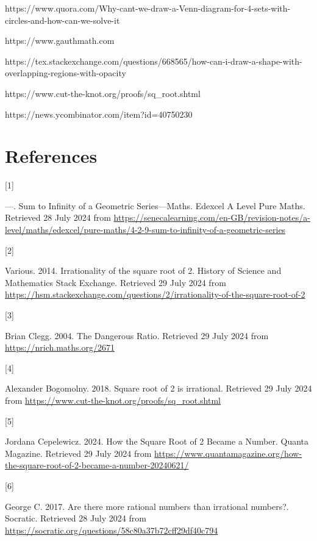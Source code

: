 \documentclass[
  a4paper,
]{article}
\newlength{\cslhangindent}
\newlength{\csllabelwidth}
\newenvironment{CSLReferences}[2] %
 {\begin{list}{}{%
  \setlength{\itemindent}{0pt}
  \setlength{\leftmargin}{0pt}
  \setlength{\parsep}{0pt}
  \ifodd #1
   \setlength{\leftmargin}{\cslhangindent}
   \setlength{\itemindent}{-1\cslhangindent}
  \fi
  \setlength{\itemsep}{#2\baselineskip}}}
 {\end{list}}
\newcommand{\CSLLeftMargin}[1]{\parbox[t]{\csllabelwidth}{\strut#1\strut}}
\newcommand{\CSLRightInline}[1]{\parbox[t]{\linewidth - \csllabelwidth}{\strut#1\strut}}
\begin{document}
https://www.quora.com/Why-cant-we-draw-a-Venn-diagram-for-4-sets-with-circles-and-how-can-we-solve-it

https://www.gauthmath.com

https://tex.stackexchange.com/questions/668565/how-can-i-draw-a-shape-with-overlapping-regions-with-opacity

https://www.cut-the-knot.org/proofs/sq\_root.shtml

https://news.ycombinator.com/item?id=40750230

\section*{References}\label{bibliography}

\label{refs}
\begin{CSLReferences}{0}{0}
\CSLLeftMargin{{[}1{]} }%
\CSLRightInline{---. {Sum to Infinity of a Geometric Series---Maths}.
{Edexcel A Level Pure Maths}. Retrieved 28 July 2024 from
\url{https://senecalearning.com/en-GB/revision-notes/a-level/maths/edexcel/pure-maths/4-2-9-sum-to-infinity-of-a-geometric-series}}

\CSLLeftMargin{{[}2{]} }%
\CSLRightInline{Various. 2014. {Irrationality of the square root of 2}.
{History of Science and Mathematics Stack Exchange}. Retrieved 29 July
2024 from
\url{https://hsm.stackexchange.com/questions/2/irrationality-of-the-square-root-of-2}}

\CSLLeftMargin{{[}3{]} }%
\CSLRightInline{Brian Clegg. 2004. {The Dangerous Ratio}. Retrieved 29
July 2024 from \url{https://nrich.maths.org/2671}}

\CSLLeftMargin{{[}4{]} }%
\CSLRightInline{Alexander Bogomolny. 2018. {Square root of 2 is
irrational}. Retrieved 29 July 2024 from
\url{https://www.cut-the-knot.org/proofs/sq_root.shtml}}

\CSLLeftMargin{{[}5{]} }%
\CSLRightInline{Jordana Cepelewicz. 2024. {How the Square Root of 2
Became a Number}. {Quanta Magazine}. Retrieved 29 July 2024 from
\url{https://www.quantamagazine.org/how-the-square-root-of-2-became-a-number-20240621/}}

\CSLLeftMargin{{[}6{]} }%
\CSLRightInline{George C. 2017. {Are there more rational numbers than
irrational numbers?}. {Socratic}. Retrieved 28 July 2024 from
\url{https://socratic.org/questions/58c80a37b72cff29df40c794}}

\end{CSLReferences}
\end{document}
